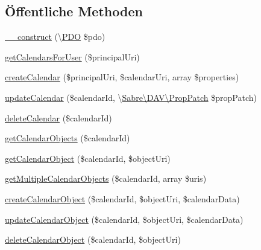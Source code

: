 \subsection*{Öffentliche Methoden}
\begin{DoxyCompactItemize}
\item 
\mbox{\hyperlink{class_sabre_1_1_cal_d_a_v_1_1_backend_1_1_p_d_o_a7bfb5fe0cf083acd9194e94e474e0918}{\+\_\+\+\_\+construct}} (\textbackslash{}\mbox{\hyperlink{class_sabre_1_1_cal_d_a_v_1_1_backend_1_1_p_d_o}{P\+DO}} \$pdo)
\item 
\mbox{\hyperlink{class_sabre_1_1_cal_d_a_v_1_1_backend_1_1_p_d_o_a6a5e51f95be75f19eecbd13c6bb90bbc}{get\+Calendars\+For\+User}} (\$principal\+Uri)
\item 
\mbox{\hyperlink{class_sabre_1_1_cal_d_a_v_1_1_backend_1_1_p_d_o_a668ecafd32745afe1cee73954ab867f0}{create\+Calendar}} (\$principal\+Uri, \$calendar\+Uri, array \$properties)
\item 
\mbox{\hyperlink{class_sabre_1_1_cal_d_a_v_1_1_backend_1_1_p_d_o_a5769761d5313fb8bc98552529e9c5e74}{update\+Calendar}} (\$calendar\+Id, \textbackslash{}\mbox{\hyperlink{class_sabre_1_1_d_a_v_1_1_prop_patch}{Sabre\textbackslash{}\+D\+A\+V\textbackslash{}\+Prop\+Patch}} \$prop\+Patch)
\item 
\mbox{\hyperlink{class_sabre_1_1_cal_d_a_v_1_1_backend_1_1_p_d_o_a8742e2649f87b0e66d9899decd6b0184}{delete\+Calendar}} (\$calendar\+Id)
\item 
\mbox{\hyperlink{class_sabre_1_1_cal_d_a_v_1_1_backend_1_1_p_d_o_a0f86121bbca86e632dd9d2b1ca14abaa}{get\+Calendar\+Objects}} (\$calendar\+Id)
\item 
\mbox{\hyperlink{class_sabre_1_1_cal_d_a_v_1_1_backend_1_1_p_d_o_a730b64c39c9ec9fd75b2c185ff7890f3}{get\+Calendar\+Object}} (\$calendar\+Id, \$object\+Uri)
\item 
\mbox{\hyperlink{class_sabre_1_1_cal_d_a_v_1_1_backend_1_1_p_d_o_ab20988584dd756f9b2742b8e67ddf514}{get\+Multiple\+Calendar\+Objects}} (\$calendar\+Id, array \$uris)
\item 
\mbox{\hyperlink{class_sabre_1_1_cal_d_a_v_1_1_backend_1_1_p_d_o_aca2a1959c60cb4d147869ed91a75ce09}{create\+Calendar\+Object}} (\$calendar\+Id, \$object\+Uri, \$calendar\+Data)
\item 
\mbox{\hyperlink{class_sabre_1_1_cal_d_a_v_1_1_backend_1_1_p_d_o_aafe753458ec28f0ffdfaa7b6c6664f83}{update\+Calendar\+Object}} (\$calendar\+Id, \$object\+Uri, \$calendar\+Data)
\item 
\mbox{\hyperlink{class_sabre_1_1_cal_d_a_v_1_1_backend_1_1_p_d_o_aff419a81f0923315834134b88b5afd09}{delete\+Calendar\+Object}} (\$calendar\+Id, \$object\+Uri)

\end{DoxyCompactItemize}

